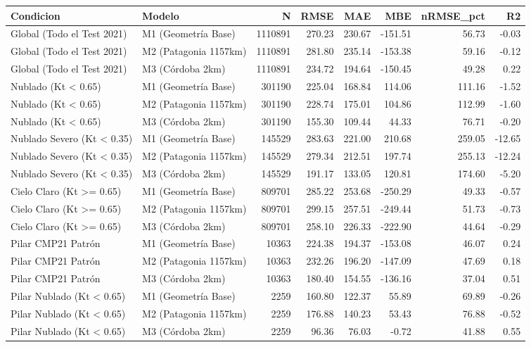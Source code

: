 \begin{tabular}{llrrrrrr}
\toprule
Condicion & Modelo & N & RMSE & MAE & MBE & nRMSE_pct & R2 \\
\midrule
Global (Todo el Test 2021) & M1 (Geometría Base) & 1110891 & 270.23 & 230.67 & -151.51 & 56.73 & -0.03 \\
Global (Todo el Test 2021) & M2 (Patagonia 1157km) & 1110891 & 281.80 & 235.14 & -153.38 & 59.16 & -0.12 \\
Global (Todo el Test 2021) & M3 (Córdoba 2km) & 1110891 & 234.72 & 194.64 & -150.45 & 49.28 & 0.22 \\
Nublado (Kt < 0.65) & M1 (Geometría Base) & 301190 & 225.04 & 168.84 & 114.06 & 111.16 & -1.52 \\
Nublado (Kt < 0.65) & M2 (Patagonia 1157km) & 301190 & 228.74 & 175.01 & 104.86 & 112.99 & -1.60 \\
Nublado (Kt < 0.65) & M3 (Córdoba 2km) & 301190 & 155.30 & 109.44 & 44.33 & 76.71 & -0.20 \\
Nublado Severo (Kt < 0.35) & M1 (Geometría Base) & 145529 & 283.63 & 221.00 & 210.68 & 259.05 & -12.65 \\
Nublado Severo (Kt < 0.35) & M2 (Patagonia 1157km) & 145529 & 279.34 & 212.51 & 197.74 & 255.13 & -12.24 \\
Nublado Severo (Kt < 0.35) & M3 (Córdoba 2km) & 145529 & 191.17 & 133.05 & 120.81 & 174.60 & -5.20 \\
Cielo Claro (Kt >= 0.65) & M1 (Geometría Base) & 809701 & 285.22 & 253.68 & -250.29 & 49.33 & -0.57 \\
Cielo Claro (Kt >= 0.65) & M2 (Patagonia 1157km) & 809701 & 299.15 & 257.51 & -249.44 & 51.73 & -0.73 \\
Cielo Claro (Kt >= 0.65) & M3 (Córdoba 2km) & 809701 & 258.10 & 226.33 & -222.90 & 44.64 & -0.29 \\
Pilar CMP21 Patrón & M1 (Geometría Base) & 10363 & 224.38 & 194.37 & -153.08 & 46.07 & 0.24 \\
Pilar CMP21 Patrón & M2 (Patagonia 1157km) & 10363 & 232.26 & 196.20 & -147.09 & 47.69 & 0.18 \\
Pilar CMP21 Patrón & M3 (Córdoba 2km) & 10363 & 180.40 & 154.55 & -136.16 & 37.04 & 0.51 \\
Pilar Nublado (Kt < 0.65) & M1 (Geometría Base) & 2259 & 160.80 & 122.37 & 55.89 & 69.89 & -0.26 \\
Pilar Nublado (Kt < 0.65) & M2 (Patagonia 1157km) & 2259 & 176.88 & 140.23 & 53.43 & 76.88 & -0.52 \\
Pilar Nublado (Kt < 0.65) & M3 (Córdoba 2km) & 2259 & 96.36 & 76.03 & -0.72 & 41.88 & 0.55 \\
\bottomrule
\end{tabular}
